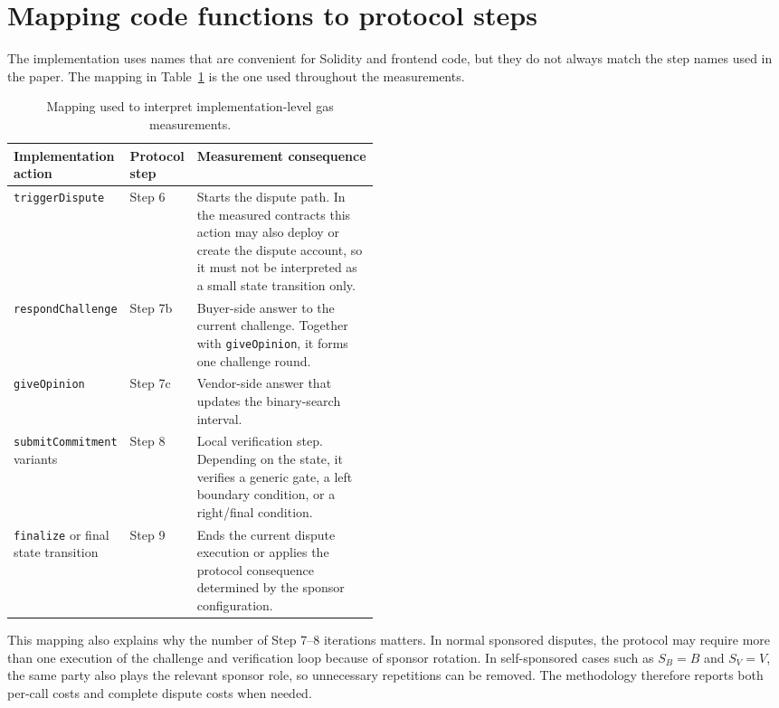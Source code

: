 \section{Mapping code functions to protocol steps}

The implementation uses names that are convenient for Solidity and frontend code, but they
do not always match the step names used in the paper. The mapping in
Table~\ref{tab:methodology-step-mapping} is the one used throughout the measurements.

\begin{table}[htbp]
  \centering
  \begin{tabularx}{\linewidth}{>{\raggedright\arraybackslash}p{0.30\linewidth}>{\raggedright\arraybackslash}p{0.17\linewidth}>{\raggedright\arraybackslash}X}
    \toprule
    Implementation action & Protocol step & Measurement consequence \\
    \midrule
    \texttt{triggerDispute} &
    Step 6 &
    Starts the dispute path. In the measured contracts this action may also deploy or create
    the dispute account, so it must not be interpreted as a small state transition only. \\
    \texttt{respondChallenge} &
    Step 7b &
    Buyer-side answer to the current challenge. Together with \texttt{giveOpinion}, it forms
    one challenge round. \\
    \texttt{giveOpinion} &
    Step 7c &
    Vendor-side answer that updates the binary-search interval. \\
    \texttt{submitCommitment} variants &
    Step 8 &
    Local verification step. Depending on the state, it verifies a generic gate, a left
    boundary condition, or a right/final condition. \\
    \texttt{finalize} or final state transition &
    Step 9 &
    Ends the current dispute execution or applies the protocol consequence determined by the
    sponsor configuration. \\
    \bottomrule
  \end{tabularx}
  \caption{Mapping used to interpret implementation-level gas measurements.}
  \label{tab:methodology-step-mapping}
\end{table}

This mapping also explains why the number of Step 7--8 iterations matters. In normal
sponsored disputes, the protocol may require more than one execution of the challenge and
verification loop because of sponsor rotation. In self-sponsored cases such as \(S_B=B\) and
\(S_V=V\), the same party also plays the relevant sponsor role, so unnecessary repetitions
can be removed. The methodology therefore reports both per-call costs and complete dispute
costs when needed.

